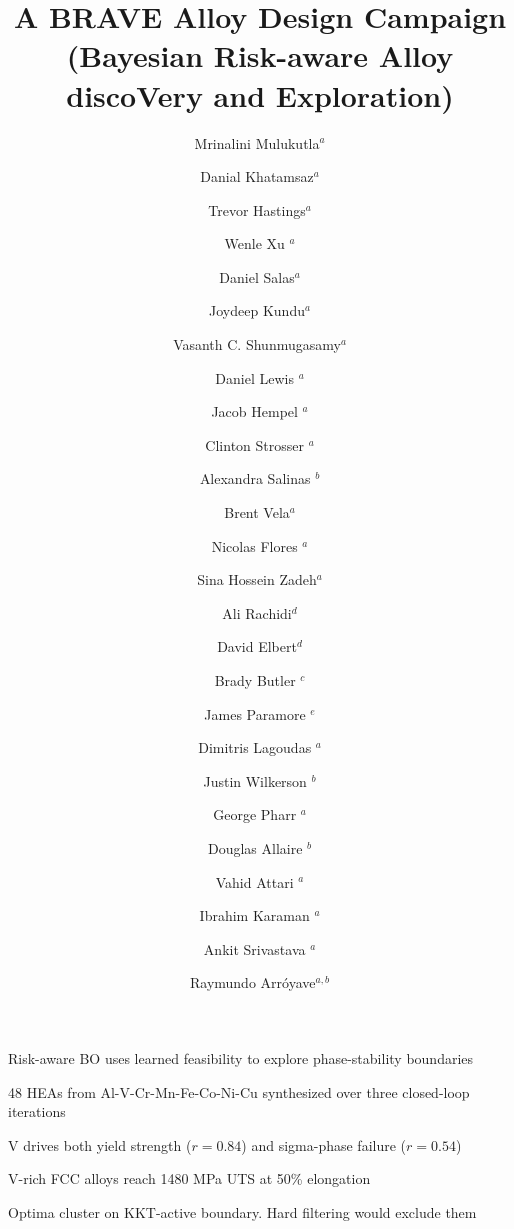 \documentclass[preprint,12pt,times]{elsarticle}  %
\begin{document}
\begin{frontmatter}
\title{\Large{A BRAVE Alloy Design Campaign\\
(Bayesian Risk-aware Alloy discoVery and Exploration)}}

\begin{highlights}
\item Risk-aware BO uses learned feasibility to explore phase-stability boundaries
\item 48 HEAs from Al-V-Cr-Mn-Fe-Co-Ni-Cu synthesized over three closed-loop iterations
\item V drives both yield strength ($r{=}0.84$) and sigma-phase failure ($r{=}0.54$)
\item V-rich FCC alloys reach 1480 MPa UTS at 50\% elongation
\item Optima cluster on KKT-active boundary. Hard filtering would exclude them
\end{highlights}




\author{Mrinalini Mulukutla$^{a}$} 
\author{Danial Khatamsaz$^{a}$}
\author{Trevor Hastings$^{a}$}
\author{Wenle Xu $^{a}$}
\author{Daniel Salas$^{a}$}
\author{Joydeep Kundu$^{a}$}
\author{Vasanth C. Shunmugasamy$^{a}$}
\author{Daniel Lewis $^{a}$}
\author{Jacob Hempel $^{a}$}
\author{Clinton Strosser $^{a}$}
\author{Alexandra Salinas $^{b}$}
\author{Brent Vela$^{a}$}
\author{Nicolas Flores $^{a}$}
\author{Sina Hossein Zadeh$^{a}$}
\author{Ali Rachidi$^{d}$}
\author{David Elbert$^{d}$}
\author{Brady Butler $^{c}$}
\author{James Paramore $^{e}$}
\author{Dimitris Lagoudas $^{a}$}
\author{Justin Wilkerson $^{b}$}
\author{George Pharr $^{a}$}
\author{Douglas Allaire $^{b}$}
\author{Vahid Attari $^{a}$}
\author{Ibrahim Karaman $^{a}$}
\author{Ankit Srivastava $^{a}$}
\author{Raymundo Arr\'{o}yave$^{a,b}$}



\end{frontmatter}
\end{document}
